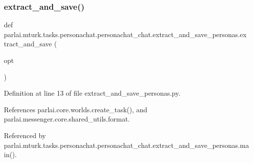 \subsubsection{\texorpdfstring{extract\+\_\+and\+\_\+save()}{extract\_and\_save()}}
{\footnotesize\ttfamily def parlai.\+mturk.\+tasks.\+personachat.\+personachat\+\_\+chat.\+extract\+\_\+and\+\_\+save\+\_\+personas.\+extract\+\_\+and\+\_\+save (\begin{DoxyParamCaption}\item[{}]{opt }\end{DoxyParamCaption})}



Definition at line 13 of file extract\+\_\+and\+\_\+save\+\_\+personas.\+py.



References parlai.\+core.\+worlds.\+create\+\_\+task(), and parlai.\+messenger.\+core.\+shared\+\_\+utils.\+format.



Referenced by parlai.\+mturk.\+tasks.\+personachat.\+personachat\+\_\+chat.\+extract\+\_\+and\+\_\+save\+\_\+personas.\+main().

